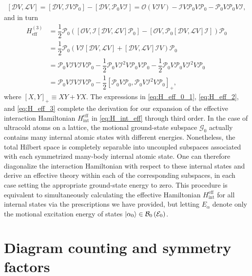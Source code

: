 \documentclass[preprint,showkeys,nofootinbib]{revtex4-1}
\renewcommand{\t}{\text} %
\newcommand{\f}{\dfrac} %
\newcommand{\p}[1]{\left(#1\right)} %
\renewcommand{\sp}[1]{\left[#1\right]} %
\newcommand{\B}{\mathcal{B}}
\newcommand{\D}{\mathcal{D}}
\newcommand{\E}{\mathcal{E}}
\newcommand{\G}{\mathcal{G}}
\newcommand{\I}{\mathcal{I}}
\renewcommand{\L}{\mathcal{L}}
\renewcommand{\O}{\mathcal{O}}
\renewcommand{\P}{\mathcal{P}}
\newcommand{\1}{\mathds{1}}
\begin{document}
\begin{align}
  \sp{\D V, \L V}
  = \sp{\D V, \I V \P_0} - \sp{\D V, \P_0 V \I}
  = \O\p{V \I V} - \I V \P_0 V \P_0 - \P_0 V \P_0 V \I,
\end{align}
and in turn
\begin{align}
  H_{\t{eff}}^{(3)}
  &= \f12 \P_0 \p{\sp{\O V, \I \sp{\D V, \L V} \P_0}
    - \sp{\O V, \P_0 \sp{\D V, \L V} \I}} \P_0 \\
  &= \f12 \P_0 \p{V \I \sp{\D V, \L V}
    + \sp{\D V, \L V} \I V} \P_0 \\
  &= \P_0 V \I V \I V \P_0
  - \f12 \P_0 V \I^2 V \P_0 V \P_0
  - \f12 \P_0 V \P_0 V \I^2 V \P_0 \\
  &= \P_0 V \I V \I V \P_0
  - \f12 \sp{\P_0 V \P_0, \P_0 V \I^2 V \P_0}_+,
  \label{eq:H_eff_3}
\end{align}
where $\sp{X,Y}_+\equiv XY+YX$.  The expressions in
\eqref{eq:H_eff_0_1}, \eqref{eq:H_eff_2}, and \eqref{eq:H_eff_3}
complete the derivation for our expansion of the effective interaction
Hamiltonian $H_{\t{int}}^{\t{eff}}$ in \eqref{eq:H_int_eff} through
third order.  In the case of ultracold atoms on a lattice, the
motional ground-state subspace $\G_0$ actually contains many internal
atomic states with different energies.  Nonetheless, the total Hilbert
space is completely separable into uncoupled subspaces associated with
each symmetrized many-body internal atomic state.  One can therefore
diagonalize the interaction Hamiltonian with respect to these internal
states and derive an effective theory within each of the corresponding
subspaces, in each case setting the appropriate ground-state energy to
zero.  This procedure is equivalent to simultaneously calculating the
effective Hamiltonian $H_{\t{int}}^{\t{eff}}$ for all internal states
via the prescriptions we have provided, but letting $E_\alpha$ denote
only the motional excitation energy of states
$\ket{\alpha_0}\in\B_0\p{\E_0}$.


\section{Diagram counting and symmetry factors}
\label{sec:diagrams}
\end{document}
